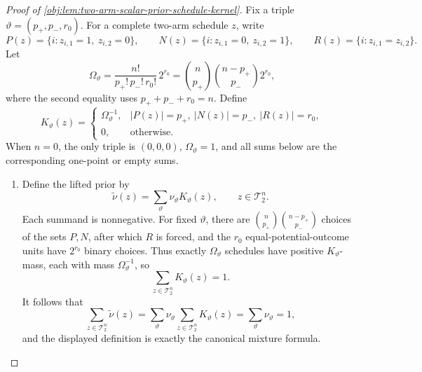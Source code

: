 \documentclass[11pt]{article}
\begin{document}
\begin{proof}[Proof of \cref{obj:lem:two-arm-scalar-prior-schedule-kernel}]
Fix a triple \(\vartheta=(p_+,p_-,r_0)\).  For a complete two-arm schedule \(z\), write
\[
P(z)=\{i:z_{i,1}=1,\ z_{i,2}=0\},\qquad
N(z)=\{i:z_{i,1}=0,\ z_{i,2}=1\},\qquad
R(z)=\{i:z_{i,1}=z_{i,2}\}.
\]
Let
\[
\Omega_\vartheta
=
\frac{n!}{p_+!\,p_-!\,r_0!}\,2^{r_0}
=
\binom n{p_+}\binom{n-p_+}{p_-}2^{r_0},
\]
where the second equality uses \(p_++p_-+r_0=n\).  Define
\[
K_\vartheta(z)
=
\begin{cases}
\Omega_\vartheta^{-1},
& |P(z)|=p_+,\ |N(z)|=p_-,\ |R(z)|=r_0,\\
0,&\text{otherwise.}
\end{cases}
\]
When \(n=0\), the only triple is \((0,0,0)\), \(\Omega_\vartheta=1\), and all sums below are the corresponding one-point or empty sums.

\begin{enumerate}
\item Define the lifted prior by
\[
\widetilde\nu(z)=\sum_{\vartheta}\nu_\vartheta K_\vartheta(z),
\qquad z\in\mathcal T_2^n .
\]
Each summand is nonnegative.  For fixed \(\vartheta\), there are
\(\binom n{p_+}\binom{n-p_+}{p_-}\) choices of the sets \(P,N\), after which \(R\) is forced, and the \(r_0\) equal-potential-outcome units have \(2^{r_0}\) binary choices.  Thus exactly \(\Omega_\vartheta\) schedules have positive \(K_\vartheta\)-mass, each with mass \(\Omega_\vartheta^{-1}\), so
\[
\sum_{z\in\mathcal T_2^n}K_\vartheta(z)=1.
\]
It follows that
\[
\sum_{z\in\mathcal T_2^n}\widetilde\nu(z)
=
\sum_\vartheta \nu_\vartheta\sum_{z\in\mathcal T_2^n}K_\vartheta(z)
=
\sum_\vartheta \nu_\vartheta
=
1,
\]
and the displayed definition is exactly the canonical mixture formula. %


\end{enumerate}
\end{proof}
\end{document}
